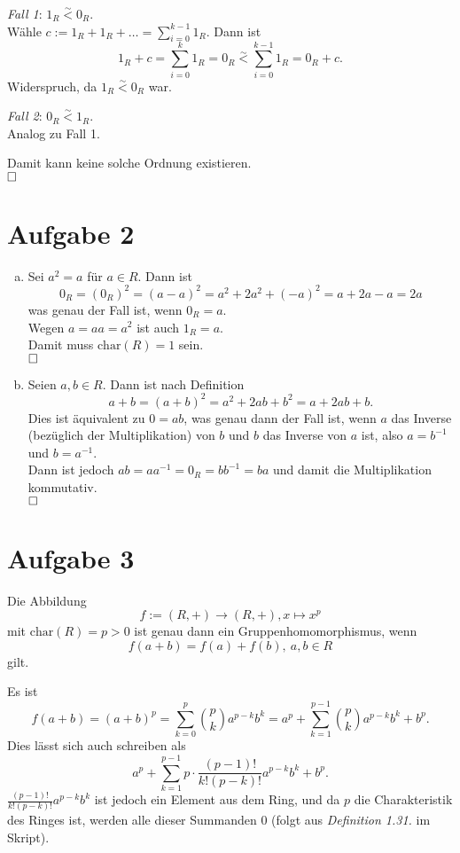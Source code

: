 \documentclass[12pt,a4paper]{article}
\newcommand{\qed}{\null\nobreak\hfill\square}
\begin{document}
\begin{enumerate}[(a)]
    \textit{Fall 1}: $1_R \overset{\sim}{<} 0_R$.\\
    Wähle $c := 1_R + 1_R + \dots = \sum\limits_{i=0}^{k-1} 1_R$.
    Dann ist
    $$1_R + c = \sum\limits_{i=0}^{k} 1_R = 0_R \overset{\sim}{<} \sum\limits_{i=0}^{k-1} 1_R = 0_R + c.$$
    Widerspruch, da $1_R \overset{\sim}{<} 0_R$ war.

    \textit{Fall 2}: $0_R \overset{\sim}{<} 1_R$.\\
    Analog zu Fall 1.

    Damit kann keine solche Ordnung existieren.\\
    $\qed$
\end{enumerate}


\section*{Aufgabe 2}

\begin{enumerate}[(a)]
    \item Sei $a^2 = a$ für $a \in R$.
    Dann ist
    $$0_R = (0_R)^2 = (a-a)^2 = a^2 + 2a^2 + (-a)^2 = a + 2a -a = 2a$$
    was genau der Fall ist, wenn $0_R = a$.\\
    Wegen $a = aa = a^2$ ist auch $1_R = a$.\\
    Damit muss $\text{char}(R) = 1$ sein.\\
    $\qed$

    \item Seien $a, b \in R$.
    Dann ist nach Definition
    $$a+b = (a+b)^2 = a^2 + 2ab + b^2 = a + 2ab + b.$$
    Dies ist äquivalent zu $0 = ab$, was genau dann der Fall ist, wenn $a$ das Inverse (bezüglich der Multiplikation) von $b$ und $b$ das Inverse von $a$ ist, also $a = b^{-1}$ und $b = a^{-1}$.\\
    Dann ist jedoch $ab = aa^{-1} = 0_R = bb^{-1} = ba$ und damit die Multiplikation kommutativ.\\
    $\qed$
\end{enumerate}


\section*{Aufgabe 3}

Die Abbildung
$$f := (R, +) \rightarrow (R, +), x \mapsto x^p$$
mit $\text{char}(R) = p > 0$ ist genau dann ein Gruppenhomomorphismus, wenn
$$f(a + b) = f(a) + f(b),\ a,b \in R$$
gilt.

Es ist
$$f(a + b) = (a + b)^p = \sum_{k=0}^{p}\binom{p}{k}a^{p-k}b^k = a^p + \sum_{k=1}^{p-1}\binom{p}{k}a^{p-k}b^k + b^p.$$
Dies lässt sich auch schreiben als
$$a^p + \sum_{k=1}^{p-1}p \cdot \frac{(p-1)!}{k!(p-k)!} a^{p-k}b^k + b^p.$$
$\frac{(p-1)!}{k!(p-k)!} a^{p-k}b^k$ ist jedoch ein Element aus dem Ring, und da $p$ die Charakteristik des Ringes ist, werden alle dieser Summanden $0$ (folgt aus \textit{Definition 1.31.} im Skript).
\end{document}
